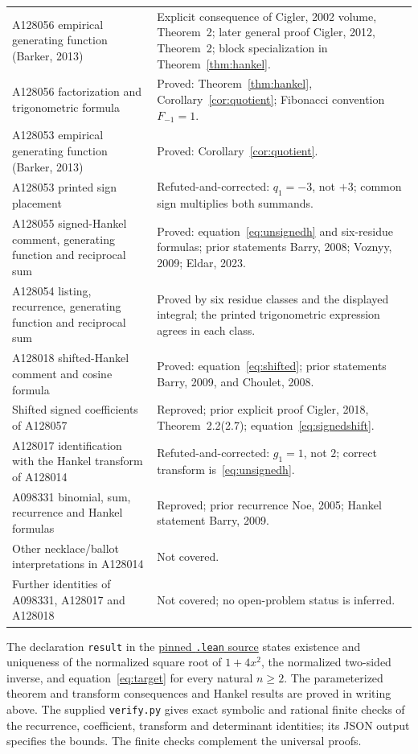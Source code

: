 \documentclass[11pt]{article}
\begin{document}
\begin{longtable}{@{}>{\raggedright\arraybackslash}p{}>{\raggedright\arraybackslash}p{}@{}}
A128056 empirical generating function (Barker, 2013) & Explicit consequence of Cigler, 2002 volume, Theorem~2; later general proof Cigler, 2012, Theorem~2; block specialization in Theorem~\ref{thm:hankel}. \\
A128056 factorization and trigonometric formula & Proved: Theorem~\ref{thm:hankel}, Corollary~\ref{cor:quotient}; Fibonacci convention $F_{-1}=1$. \\
A128053 empirical generating function (Barker, 2013) & Proved: Corollary~\ref{cor:quotient}. \\
A128053 printed sign placement & Refuted-and-corrected: $q_1=-3$, not $+3$; common sign multiplies both summands. \\
A128055 signed-Hankel comment, generating function and reciprocal sum & Proved: equation~\eqref{eq:unsignedh} and six-residue formulas; prior statements Barry, 2008; Voznyy, 2009; Eldar, 2023. \\
A128054 listing, recurrence, generating function and reciprocal sum & Proved by six residue classes and the displayed integral; the printed trigonometric expression agrees in each class. \\
A128018 shifted-Hankel comment and cosine formula & Proved: equation~\eqref{eq:shifted}; prior statements Barry, 2009, and Choulet, 2008. \\
Shifted signed coefficients of A128057 & Reproved; prior explicit proof Cigler, 2018, Theorem~2.2(2.7); equation~\eqref{eq:signedshift}. \\
A128017 identification with the Hankel transform of A128014 & Refuted-and-corrected: $g_1=1$, not $2$; correct transform is~\eqref{eq:unsignedh}. \\
A098331 binomial, sum, recurrence and Hankel formulas & Reproved; prior recurrence Noe, 2005; Hankel statement Barry, 2009. \\
Other necklace/ballot interpretations in A128014 & Not covered. \\
Further identities of A098331, A128017 and A128018 & Not covered; no open-problem status is inferred. \\
\bottomrule
\end{longtable}
\normalsize

The declaration \texttt{result} in the
\href{https://github.com/the-omega-institute/trureturing/blob/2f8421f6b90d37b4815b887f6c60987553831b20/D5/S1/Recurrence/Algebraic/MatharA128057ThreeTermRecurrence.lean}{pinned \texttt{.lean} source}
states existence and uniqueness of the normalized square root of $1+4x^2$,
the normalized two-sided inverse, and equation~\eqref{eq:target} for every
natural $n\geq2$. The parameterized theorem and transform consequences
and Hankel results are proved in writing above. The supplied
\texttt{verify.py} gives exact symbolic and rational finite checks of
the recurrence, coefficient, transform and determinant identities;
its JSON output specifies the bounds. The finite checks complement
the universal proofs.
\end{document}
